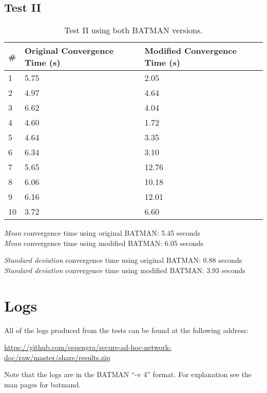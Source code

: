 \subsection{Test II}
\begin{table}[h!]
	\centering
	\begin{tabular}{| l || p{35mm} | p{35mm} |}\hline
	\textbf{\#} & \textbf{Original Convergence Time (s)} & \textbf{Modified Convergence Time (s)}\\\hline
		 1 & 5.75 & 2.05\\\hline
		 2 & 4.97 & 4.64\\\hline
		 3 & 6.62 & 4.04\\\hline
		 4 & 4.60 & 1.72\\\hline
		 5 & 4.64 & 3.35\\\hline
		 6 & 6.34 & 3.10\\\hline
		 7 & 5.65 & 12.76\\\hline
		 8 & 6.06 & 10.18\\\hline
		 9 & 6.16 & 12.01\\\hline
		10 & 3.72 & 6.60\\\hline
	\end{tabular}
	\caption{Test II using both BATMAN versions.}
	\label{tab:test2}
\end{table}

\emph{Mean} convergence time using original BATMAN: 5.45 seconds\\
\emph{Mean} convergence time using modified BATMAN: 6.05 seconds

\emph{Standard deviation} convergence time using original BATMAN: 0.88 seconds\\
\emph{Standard deviation} convergence time using modified BATMAN: 3.93 seconds

\section{Logs}
All of the logs produced from the tests can be found at the following address:

\url{https://github.com/espengra/secure-ad-hoc-network-doc/raw/master/share/results.zip}

Note that the logs are in the BATMAN ``-v 4'' format. For explanation see the
man pages for batmand.


